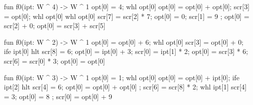 \documentclass[sigplan,nonacm]{acmart}\settopmatter{printfolios=false,printccs=false,printacmref=false}
\begin{document}
\begin{dslblock}[BB \#1 $(\tau_h = 1549)$]
   fun f0(ipt: W ^ 4) -> W ^ 1 {
      opt[0] = 4;
      whl opt[0] {
         opt[0] = opt[0] + opt[0];
         scr[3] = opt[0];
         whl opt[0] {
            whl opt[0] {
               scr[7] = scr[2] * 7;
               opt[0] = 0;
               scr[1] = 9
            }
         };
         opt[0] = scr[2] + 0;
         opt[0] = scr[3] + scr[5]
      }
   }
\end{dslblock}

\begin{dslblock}[BB \#2 $(\tau_h = 1272)$]
   fun f0(ipt: W ^ 2) -> W ^ 1 {
      opt[0] = opt[0] + 6;
      whl opt[0] {
         scr[3] = opt[0] + 0;
         ife ipt[0] { hlt } {
            scr[8] = 6;
            opt[0] = ipt[0] + 3; scr[0] = ipt[1] * 2;
            opt[0] = scr[3] * 6; scr[6] = scr[0] * 3;
            opt[0] = opt[0]
         }
      }
   }
\end{dslblock}

\begin{dslblock}[BB \#3 $(\tau_h = 1255)$]
   fun f0(ipt: W ^ 3) -> W ^ 1 {
      opt[0] = 1;
      whl opt[0] {
         opt[0] = opt[0] + ipt[0];
         ife ipt[2] { hlt } {
            scr[4] = 6;
            opt[0] = opt[0] + opt[0]
         };
         scr[6] = scr[8] * 2;
         whl ipt[1] { scr[4] = 3; opt[0] = 8 };
         scr[0] = opt[0] + 9
      }
   }
\end{dslblock}
\clearpage
\end{document}
